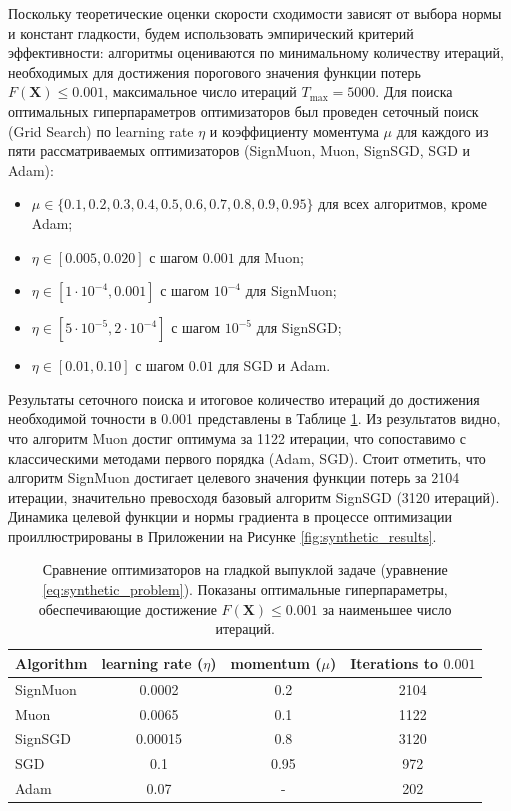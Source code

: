 \documentclass{article}
\begin{document}
Поскольку теоретические оценки скорости сходимости зависят от выбора нормы и констант гладкости, будем использовать эмпирический критерий эффективности: алгоритмы оцениваются по минимальному количеству итераций, необходимых для достижения порогового значения функции потерь $F(\mathbf{X}) \le 0.001$, максимальное число итераций $T_{\max} = 5000$. Для поиска оптимальных гиперпараметров оптимизаторов был проведен сеточный поиск (Grid Search) по learning rate $\eta$ и коэффициенту моментума $\mu$ для каждого из пяти рассматриваемых оптимизаторов (SignMuon, Muon, SignSGD, SGD и Adam):
\begin{itemize}
    \item $\mu \in \{0.1, 0.2, 0.3, 0.4, 0.5, 0.6, 0.7, 0.8, 0.9, 0.95\}$ для всех алгоритмов, кроме Adam;
    \item $\eta \in [0.005, 0.020]$ с шагом $0.001$ для Muon;
    \item $\eta \in [1\cdot 10^{-4}, 0.001]$ с шагом $10^{-4}$ для SignMuon;
    \item $\eta \in [5\cdot 10^{-5}, 2\cdot 10^{-4}]$ с шагом $10^{-5}$ для SignSGD;
    \item $\eta \in [0.01, 0.10]$ с шагом $0.01$ для SGD и Adam.
\end{itemize}

Результаты сеточного поиска и итоговое количество итераций до достижения необходимой точности в 0.001 представлены в Таблице \ref{tab:synthetic_results}. Из результатов видно, что алгоритм Muon достиг оптимума за 1122 итерации, что сопоставимо с классическими методами первого порядка (Adam, SGD). Стоит отметить, что алгоритм SignMuon достигает целевого значения функции потерь за 2104 итерации, значительно превосходя базовый алгоритм SignSGD (3120 итераций). Динамика целевой функции и нормы градиента в процессе оптимизации проиллюстрированы в Приложении на Рисунке \ref{fig:synthetic_results}.

\begin{table}[H]
\centering
\caption{Сравнение оптимизаторов на гладкой выпуклой задаче (уравнение \ref{eq:synthetic_problem}). Показаны оптимальные гиперпараметры, обеспечивающие достижение $F(\mathbf{X}) \le 0.001$ за наименьшее число итераций.}
\label{tab:synthetic_results}
\small
\renewcommand{\arraystretch}{1.2}
\begin{tabular}{|l|c|c|c|}
\hline
Algorithm & learning rate ($\eta$) & momentum ($\mu$) & Iterations to $0.001$ \\
\hline
SignMuon & 0.0002 & 0.2 & 2104 \\
Muon & 0.0065 & 0.1 & 1122 \\
SignSGD & 0.00015 & 0.8 & 3120 \\
SGD & 0.1 & 0.95 & 972 \\
Adam &  0.07 & - & 202 \\
\hline
\end{tabular}
\end{table}
\end{document}
